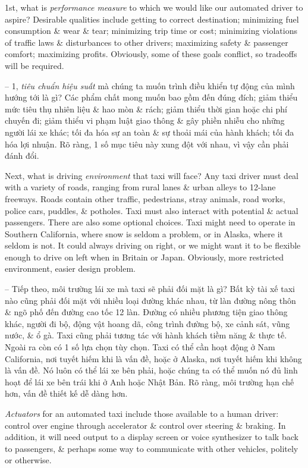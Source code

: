 \documentclass{article}
\begin{document}
\begin{itemize}
\begin{itemize}
\begin{itemize}
\begin{itemize}
				1st, what is {\it performance measure} to which we would like our automated driver to aspire? Desirable qualities include getting to correct destination; minimizing fuel consumption \& wear \& tear; minimizing trip time or cost; minimizing violations of traffic laws \& disturbances to other drivers; maximizing safety \& passenger comfort; maximizing profits. Obviously, some of these goals conflict, so tradeoffs will be required.

				-- 1, {\it tiêu chuẩn hiệu suất} mà chúng ta muốn trình điều khiển tự động của mình hướng tới là gì? Các phẩm chất mong muốn bao gồm đến đúng đích; giảm thiểu mức tiêu thụ nhiên liệu \& hao mòn \& rách; giảm thiểu thời gian hoặc chi phí chuyến đi; giảm thiểu vi phạm luật giao thông \& gây phiền nhiễu cho những người lái xe khác; tối đa hóa sự an toàn \& sự thoải mái của hành khách; tối đa hóa lợi nhuận. Rõ ràng, 1 số mục tiêu này xung đột với nhau, vì vậy cần phải đánh đổi.

				Next, what is driving {\it environment} that taxi will face? Any taxi driver must deal with a variety of roads, ranging from rural lanes \& urban alleys to 12-lane freeways. Roads contain other traffic, pedestrians, stray animals, road works, police cars, puddles, \& potholes. Taxi must also interact with potential \& actual passengers. There are also some optional choices. Taxi might need to operate in Southern California, where snow is seldom a problem, or in Alaska, where it seldom is not. It could always driving on right, or we might want it to be flexible enough to drive on left when in Britain or Japan. Obviously, more restricted environment, easier design problem.

				-- Tiếp theo, môi trường lái xe mà taxi sẽ phải đối mặt là gì? Bất kỳ tài xế taxi nào cũng phải đối mặt với nhiều loại đường khác nhau, từ làn đường nông thôn \& ngõ phố đến đường cao tốc 12 làn. Đường có nhiều phương tiện giao thông khác, người đi bộ, động vật hoang dã, công trình đường bộ, xe cảnh sát, vũng nước, \& ổ gà. Taxi cũng phải tương tác với hành khách tiềm năng \& thực tế. Ngoài ra còn có 1 số lựa chọn tùy chọn. Taxi có thể cần hoạt động ở Nam California, nơi tuyết hiếm khi là vấn đề, hoặc ở Alaska, nơi tuyết hiếm khi không là vấn đề. Nó luôn có thể lái xe bên phải, hoặc chúng ta có thể muốn nó đủ linh hoạt để lái xe bên trái khi ở Anh hoặc Nhật Bản. Rõ ràng, môi trường hạn chế hơn, vấn đề thiết kế dễ dàng hơn.

				{\it Actuators} for an automated taxi include those available to a human driver: control over engine through accelerator \& control over steering \& braking. In addition, it will need output to a display screen or voice synthesizer to talk back to passengers, \& perhaps some way to communicate with other vehicles, politely or otherwise.


\end{itemize}
\end{itemize}
\end{itemize}
\end{itemize}
\end{document}

